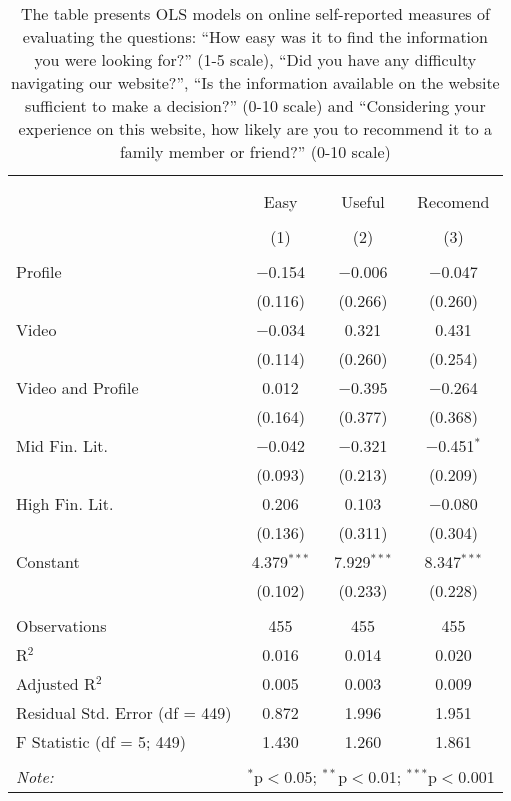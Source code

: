 
\begin{table}[H] \centering 
  \caption{The table presents OLS models on online self-reported measures of evaluating the questions: 
            ``How easy was it to find the information you were looking for?'' (1-5 scale), 
            ``Did you have any difficulty navigating our website?'', 
            ``Is the information available on the website sufficient to make a decision?'' (0-10 scale) and ``Considering your experience on this website, how likely are you to recommend it to a family member or friend?'' (0-10 scale)
          } 
  \label{tbl:self_reported_online} 
\begin{tabular}{@{\extracolsep{5pt}}lccc} 
\\[-1.8ex]\hline 
\hline \\[-1.8ex] 
\\[-1.8ex] & Easy & Useful & Recomend \\ 
\\[-1.8ex] & (1) & (2) & (3)\\ 
\hline \\[-1.8ex] 
 Profile & $-$0.154 & $-$0.006 & $-$0.047 \\ 
  & (0.116) & (0.266) & (0.260) \\ 
  Video & $-$0.034 & 0.321 & 0.431 \\ 
  & (0.114) & (0.260) & (0.254) \\ 
  Video and Profile & 0.012 & $-$0.395 & $-$0.264 \\ 
  & (0.164) & (0.377) & (0.368) \\ 
  Mid Fin. Lit. & $-$0.042 & $-$0.321 & $-$0.451$^{*}$ \\ 
  & (0.093) & (0.213) & (0.209) \\ 
  High Fin. Lit. & 0.206 & 0.103 & $-$0.080 \\ 
  & (0.136) & (0.311) & (0.304) \\ 
  Constant & 4.379$^{***}$ & 7.929$^{***}$ & 8.347$^{***}$ \\ 
  & (0.102) & (0.233) & (0.228) \\ 
 \hline \\[-1.8ex] 
Observations & 455 & 455 & 455 \\ 
R$^{2}$ & 0.016 & 0.014 & 0.020 \\ 
Adjusted R$^{2}$ & 0.005 & 0.003 & 0.009 \\ 
Residual Std. Error (df = 449) & 0.872 & 1.996 & 1.951 \\ 
F Statistic (df = 5; 449) & 1.430 & 1.260 & 1.861 \\ 
\hline 
\hline \\[-1.8ex] 
\textit{Note:}  & \multicolumn{3}{l}{$^{*}$p$<$0.05; $^{**}$p$<$0.01; $^{***}$p$<$0.001} \\ 
\end{tabular} 
\end{table} 
